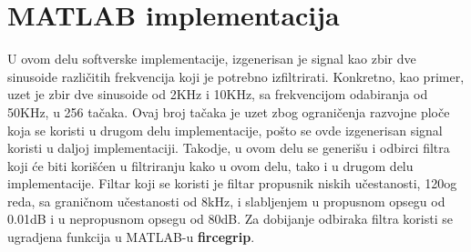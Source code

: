 \documentclass[a4paper,12pt, projekat]{etf}
\begin{document}
\section{MATLAB implementacija}
U ovom delu softverske implementacije, izgenerisan je signal kao zbir dve sinusoide razli\v{c}itih
frekvencija koji je potrebno izfiltrirati. Konkretno, kao primer, uzet je zbir dve sinusoide od 2KHz
i 10KHz, sa frekvencijom odabiranja od 50KHz, u 256 ta\v{c}aka. Ovaj broj ta\v{c}aka je uzet zbog
ograni\v{c}enja razvojne plo\v{c}e koja se koristi u drugom delu implementacije, po\v{s}to se ovde
izgenerisan signal koristi u daljoj implementaciji. Takodje, u ovom delu se generi\v{s}u i odbirci
filtra koji \'{c}e biti kori\v{s}\'{c}en u filtriranju kako u ovom delu, tako i u drugom delu
implementacije. Filtar koji se koristi je filtar propusnik niskih u\v{c}estanosti, 120og reda, sa
grani\v{c}nom u\v{c}estanosti od 8kHz, i slabljenjem u propusnom opsegu od 0.01dB i u nepropusnom
opsegu od 80dB. Za dobijanje odbiraka filtra koristi se ugradjena funkcija u MATLAB-u \textbf{fircegrip}.
\end{document}
